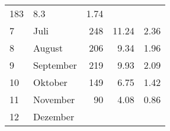 \begin{longtable}{lXrrr}
       \num{183} &
       \num[round-mode=places,round-precision=2]{8,3} &
         \num[round-mode=places,round-precision=2]{1,74} \\

     7 &
     \multicolumn{1}{X}{ Juli   } &


       \num{248} &
       \num[round-mode=places,round-precision=2]{11,24} &
         \num[round-mode=places,round-precision=2]{2,36} \\

     8 &
     \multicolumn{1}{X}{ August   } &


       \num{206} &
       \num[round-mode=places,round-precision=2]{9,34} &
         \num[round-mode=places,round-precision=2]{1,96} \\

     9 &
     \multicolumn{1}{X}{ September   } &


       \num{219} &
       \num[round-mode=places,round-precision=2]{9,93} &
         \num[round-mode=places,round-precision=2]{2,09} \\

     10 &
     \multicolumn{1}{X}{ Oktober   } &


       \num{149} &
       \num[round-mode=places,round-precision=2]{6,75} &
         \num[round-mode=places,round-precision=2]{1,42} \\

     11 &
     \multicolumn{1}{X}{ November   } &


       \num{90} &
       \num[round-mode=places,round-precision=2]{4,08} &
         \num[round-mode=places,round-precision=2]{0,86} \\

     12 &
     \multicolumn{1}{X}{ Dezember   } &



\end{longtable}
